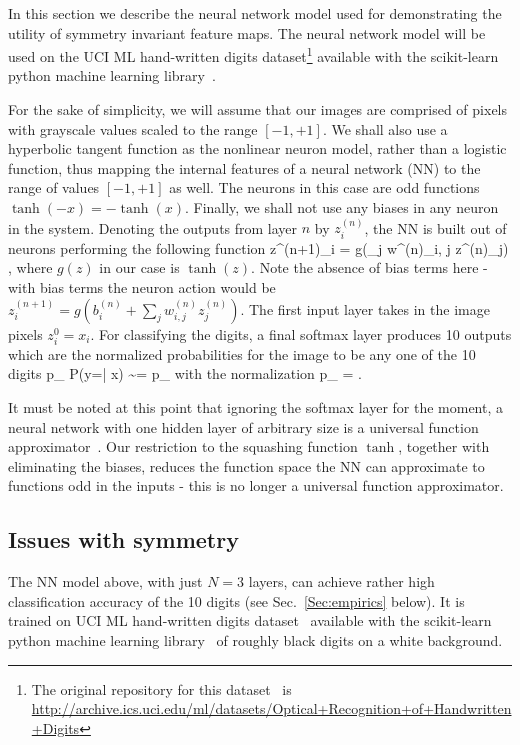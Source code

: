 \documentclass[onecolumn, nofootinbib, aps, pra, 11pt]{revtex4-1}
\begin{document}
In this section we describe the neural network model used for demonstrating the utility of symmetry invariant feature maps. The neural network model will be used on the UCI ML hand-written digits dataset\footnote{The original repository for this dataset~\citep{Dua:2017} is \url{http://archive.ics.uci.edu/ml/datasets/Optical+Recognition+of+Handwritten+Digits}} available with the scikit-learn python machine learning library~\citep{scikit-learn}.

For the sake of simplicity, we will assume that our images are comprised of pixels with grayscale values scaled to the range $[-1,+1]$. We shall also use a hyperbolic tangent function as the nonlinear neuron model, rather than a logistic function, thus mapping the internal features of a neural network (NN) to the range of values $[-1, +1]$ as well. The neurons in this case are odd functions $\tanh(-x) = - \tanh(x)$. Finally, we shall not use any biases in any neuron in the system. Denoting the outputs from layer $n$ by $z^{(n)}_i$, the NN is built out of neurons performing the following function
\be
z^{(n+1)}_i = g\left(\sum_j w^{(n)}_{i, j} z^{(n)}_j\right)
\; ,
\ee
where $g(z)$ in our case is $\tanh(z)$. Note the absence of bias terms here - with bias terms the neuron action would be 
$ z^{(n+1)}_i = g\left(b^{(n)}_i + \sum_j w^{(n)}_{i, j} z^{(n)}_j\right) $. The first input layer takes in the image pixels $z^0_i = x_i$. For classifying the digits, a final softmax layer produces 10 outputs which are the normalized probabilities for the image to be any one of the 10 digits
\be\label{softmax_1}
p_{\alpha} \equiv P(y=\alpha | x) \sim \exp{} = {\tilde p}_{\alpha}
\ee
with the normalization
\be\label{softmax_2}
p_{\alpha} = 
\; .
\ee

It must be noted at this point that ignoring the softmax layer for the moment, a neural network with one hidden layer of arbitrary size is a universal function approximator~\citep{hornik1989multilayer}. Our restriction to the squashing function $\tanh$, together with eliminating the biases, reduces the function space the NN can approximate to functions odd in the inputs - this is no longer a universal function approximator.

\subsection{Issues with symmetry}

The NN model above, with just $N=3$ layers, can achieve rather high classification accuracy of the 10 digits (see Sec.~\ref{Sec:empirics} below).
It is trained on UCI ML hand-written digits dataset~\citep{Dua:2017} available with the scikit-learn python machine learning library~\citep{scikit-learn} of roughly black digits on a white background.
\end{document}

